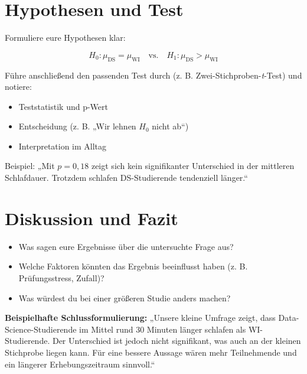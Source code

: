 \documentclass[12pt,a4paper]{article}
\begin{document}
\section{Hypothesen und Test}

Formuliere eure Hypothesen klar:

\[
H_0: \mu_{\text{DS}} = \mu_{\text{WI}} \quad \text{vs.} \quad H_1: \mu_{\text{DS}} > \mu_{\text{WI}}
\]

Führe anschließend den passenden Test durch (z. B. Zwei-Stichproben-\textit{t}-Test) und notiere:
\begin{itemize}
  \item Teststatistik und p-Wert
  \item Entscheidung (z. B. „Wir lehnen \(H_0\) nicht ab“)
  \item Interpretation im Alltag
\end{itemize}

Beispiel:  
„Mit \(p = 0{,}18\) zeigt sich kein signifikanter Unterschied in der mittleren Schlafdauer. Trotzdem schlafen DS-Studierende tendenziell länger.“

\section{Diskussion und Fazit}

\begin{itemize}
  \item Was sagen eure Ergebnisse über die untersuchte Frage aus?
  \item Welche Faktoren könnten das Ergebnis beeinflusst haben (z. B. Prüfungsstress, Zufall)?
  \item Was würdest du bei einer größeren Studie anders machen?
\end{itemize}

\textbf{Beispielhafte Schlussformulierung:}  
„Unsere kleine Umfrage zeigt, dass Data-Science-Studierende im Mittel rund 30 Minuten länger schlafen als WI-Studierende. Der Unterschied ist jedoch nicht signifikant, was auch an der kleinen Stichprobe liegen kann. Für eine bessere Aussage wären mehr Teilnehmende und ein längerer Erhebungszeitraum sinnvoll.“


\end{document}
